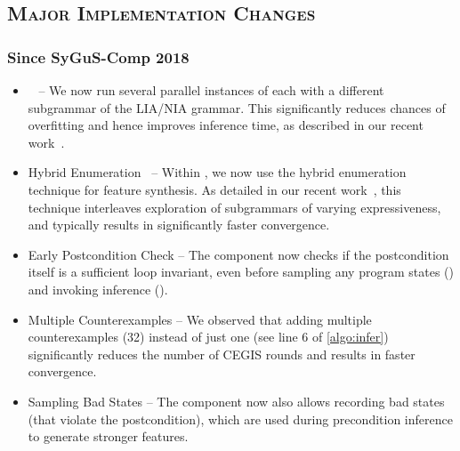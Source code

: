 \documentclass[conference]{IEEEtran}
\begin{document}
\subsection*{\textsc{Major Implementation Changes}}

\subsubsection*{Since SyGuS-Comp 2018}
\begin{itemize}
    \item {}~\citep{Padhi2019OverfittingSTP} --
          We now run several parallel instances of \Infer each with a different subgrammar of the LIA/NIA grammar.
          This significantly reduces chances of overfitting and hence improves inference time,
          as described in our recent work~\cite{Padhi2019OverfittingSTP}.

    \item Hybrid Enumeration~\citep{Padhi2019OverfittingSTP} --
          Within \PIE, we now use the hybrid enumeration technique for feature synthesis.
          As detailed in our recent work~\cite{Padhi2019OverfittingSTP},
          this technique interleaves exploration of subgrammars of varying expressiveness,
          and typically results in significantly faster convergence.

    \item Early Postcondition Check --
          The \Process{} component now checks if the postcondition itself is a sufficient loop invariant,
          even before sampling any program states (\Record) and invoking inference (\Infer).

    \item Multiple Counterexamples --
          We observed that adding multiple counterexamples (32) instead of just one (see line 6 of \cref{algo:infer})
          significantly reduces the number of CEGIS rounds and results in faster convergence.

    \item Sampling Bad States --
          The \Record{} component now also allows recording bad states (that violate the postcondition),
          which are used during precondition inference to generate stronger features.
\end{itemize}
\end{document}

